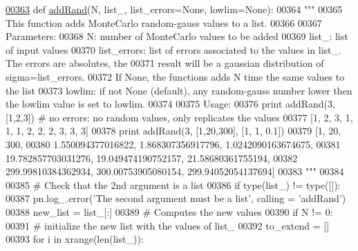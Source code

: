 \begin{DoxyCode}
\hypertarget{namespacepyneb_1_1utils_1_1misc_l00363}{}\hyperlink{namespacepyneb_1_1utils_1_1misc_af39dcb3c2627e5f29063e47ca4327f94}{00363} \textcolor{keyword}{def }\hyperlink{namespacepyneb_1_1utils_1_1misc_af39dcb3c2627e5f29063e47ca4327f94}{addRand}(N, list\_, list\_errors=None, lowlim=None):
00364     \textcolor{stringliteral}{"""}
00365 \textcolor{stringliteral}{    This function adds MonteCarlo random-gauss values to a list.}
00366 \textcolor{stringliteral}{    }
00367 \textcolor{stringliteral}{    Parameters:}
00368 \textcolor{stringliteral}{        N: number of MonteCarlo values to be added}
00369 \textcolor{stringliteral}{        list\_: list of input values}
00370 \textcolor{stringliteral}{        list\_errors: list of errors associated to the values in list\_. The errors are absolutes, the }
00371 \textcolor{stringliteral}{            result will be a gaussian distribution of sigma=list\_errors.}
00372 \textcolor{stringliteral}{            If None, the functions adds N time the same values to the list}
00373 \textcolor{stringliteral}{        lowlim: if not None (default), any random-gauss number lower then the lowlim value is set to
       lowlim.}
00374 \textcolor{stringliteral}{        }
00375 \textcolor{stringliteral}{    Usage:}
00376 \textcolor{stringliteral}{        print addRand(3, [1,2,3]) # no errors: no random values, only replicates the values}
00377 \textcolor{stringliteral}{            [1, 2, 3, 1, 1, 1, 2, 2, 2, 3, 3, 3]}
00378 \textcolor{stringliteral}{        print addRand(3, [1,20,300], [1, 1, 0.1])}
00379 \textcolor{stringliteral}{            [1, 20, 300, }
00380 \textcolor{stringliteral}{            1.550094377016822, 1.868307356917796, 1.0242090163674675, }
00381 \textcolor{stringliteral}{            19.782857703031276, 19.049474190752157, 21.58680361755194, }
00382 \textcolor{stringliteral}{            299.99810384362934, 300.00753905080154, 299.94052054137694]}
00383 \textcolor{stringliteral}{    """}
00384     
00385     \textcolor{comment}{# Check that the 2nd argument is a list}
00386     \textcolor{keywordflow}{if} type(list\_) != type([]):
00387         pn.log\_.error(\textcolor{stringliteral}{'The second argument must be a list'}, calling = \textcolor{stringliteral}{'addRand'})
00388     new\_list = list\_[:]
00389     \textcolor{comment}{# Computes the new values}
00390     \textcolor{keywordflow}{if} N != 0:
00391         \textcolor{comment}{# initialize the new list with the values of list\_}
00392         to\_extend = []
00393         \textcolor{keywordflow}{for} i \textcolor{keywordflow}{in} xrange(len(list\_)):

\end{DoxyCode}
